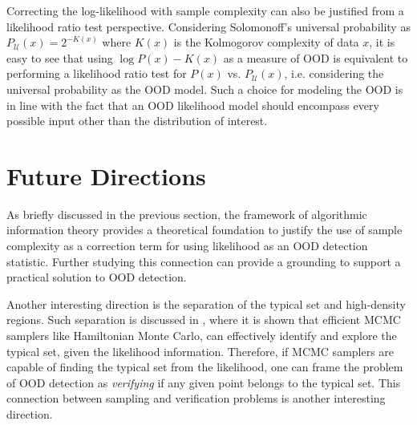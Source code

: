 Correcting the log-likelihood with sample complexity can also be justified from a likelihood ratio test perspective. Considering Solomonoff’s universal probability as $P_\mathcal{U}(x)=2^{-K(x)}$ where $K(x)$ is the Kolmogorov complexity of data $x$, it is easy to see that using $\log P(x) - K(x) $ as a measure of OOD is equivalent to performing a likelihood ratio test for $P(x)$ vs. $P_\mathcal{U}(x)$, i.e. considering the universal probability as the OOD model. Such a choice for modeling the OOD is in line with the fact that an OOD likelihood model should encompass every possible input other than the distribution of interest. 

\section{Future Directions}

As briefly discussed in the previous section, the framework of algorithmic information theory provides a theoretical foundation to justify the use of sample complexity as a correction term for using likelihood as an OOD detection statistic. Further studying this connection can provide a grounding to support a practical solution to OOD detection.

Another interesting direction is the separation of the typical set and high-density regions. Such separation is discussed in \cite{betancourt2017conceptual}, where it is shown that efficient MCMC samplers like Hamiltonian Monte Carlo, can effectively identify and explore the typical set, given the likelihood information. Therefore, if MCMC samplers are capable of finding the typical set from the likelihood, one can frame the problem of OOD detection as \textit{verifying} if any given point belongs to the typical set. This connection between sampling and verification problems is another interesting direction.